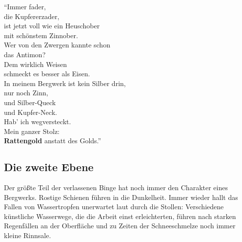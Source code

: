 

\enquote{Immer fader,\\ die Kupfererzader,\\
ist jetzt voll wie ein Heuschober\\ mit schönstem Zinnober.\\
Wer von den Zwergen kannte schon\\ das Antimon?\\
Dem wirklich Weisen\\ schmeckt es besser als Eisen.\\
In meinem Bergwerk ist kein Silber drin,\\ nur noch Zinn,\\
und Silber-Queck\\ und Kupfer-Neck.\\ Hab' ich wegversteckt.\\
Mein ganzer Stolz:\\ \textbf{Rattengold} anstatt des Golds.}



\neuespalte
\subsection{Die zweite Ebene}
Der größte Teil der verlassenen Binge hat noch immer den Charakter eines Bergwerks.
Rostige Schienen führen in die Dunkelheit.
Immer wieder hallt das Fallen von Wassertropfen unerwartet laut durch die Stollen:
Verschiedene künstliche Wasserwege, die die Arbeit einst erleichterten, führen nach starken Regenfällen an der Oberfläche und zu Zeiten der Schneeschmelze noch immer kleine Rinnsale.

